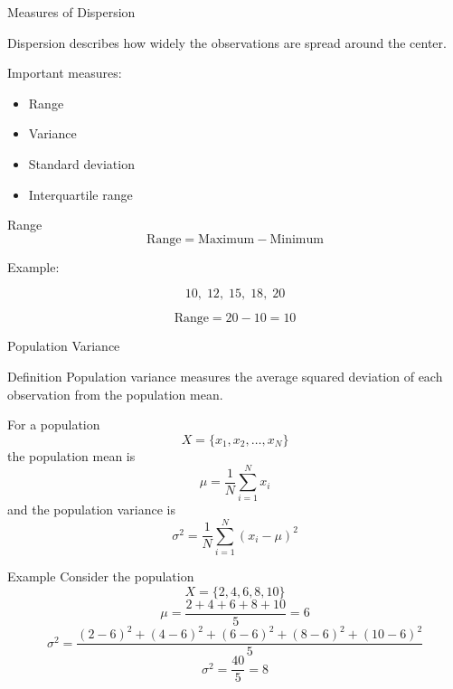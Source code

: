 \documentclass[aspectratio=169]{beamer}
\begin{document}
\begin{frame}{Measures of Dispersion}

Dispersion describes how widely the observations are spread
around the center.

Important measures:

\begin{itemize}
    \item Range
    \item Variance
    \item Standard deviation
    \item Interquartile range
\end{itemize}

\begin{block}{Range}
\[
\boxed{
\text{Range}=\text{Maximum}-\text{Minimum}
}
\]
\end{block}

Example:

\[
10,\;12,\;15,\;18,\;20
\]

\[
\text{Range}=20-10=10
\]
\end{frame}
\begin{frame}{Population Variance}
\begin{block}{Definition}
Population variance measures the average squared deviation of
each observation from the population mean.
\end{block}
\vspace{0.2cm}
For a population
\[
X=\{x_1,x_2,\ldots,x_N\}
\]
the population mean is
\[
\mu=\frac{1}{N}\sum_{i=1}^{N}x_i
\]
and the population variance is
\[
\boxed{
\sigma^2=
\frac{1}{N}\sum_{i=1}^{N}(x_i-\mu)^2
}
\]
\vspace{0.3cm}
\begin{exampleblock}{Example}
Consider the population
\[
X=\{2,4,6,8,10\}
\]
\[
\mu=\frac{2+4+6+8+10}{5}=6
\]
\[
\sigma^2=
\frac{(2-6)^2+(4-6)^2+(6-6)^2+(8-6)^2+(10-6)^2}{5}
\]
\[
\boxed{\sigma^2=\frac{40}{5}=8}
\]
\end{exampleblock}
\end{frame}
\end{document}
